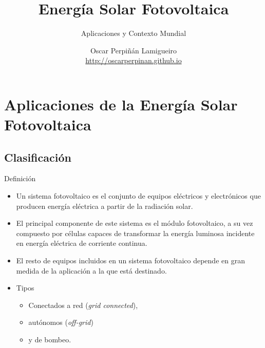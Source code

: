 \documentclass[xcolor={usenames,svgnames,dvipsnames}]{beamer}
\author{Oscar Perpiñán Lamigueiro \\ \url{http://oscarperpinan.github.io}}
\date{}
\title{Energía Solar Fotovoltaica}
\subtitle{Aplicaciones y Contexto Mundial}
\begin{document}
\maketitle

\section{Aplicaciones de la Energía Solar Fotovoltaica}
\label{sec:org6c56168}

\subsection{Clasificación}
\label{sec:org449f094}

\begin{frame}[label={sec:orgf003049}]{Definición}
\begin{itemize}
\item Un sistema fotovoltaico es el conjunto de equipos eléctricos y
electrónicos que producen energía eléctrica a partir de la radiación
solar.

\item El principal componente de este sistema es el módulo fotovoltaico, a
su vez compuesto por células capaces de transformar la energía
luminosa incidente en energía eléctrica de corriente continua.

\item El resto de equipos incluidos en un sistema fotovoltaico depende en
gran medida de la aplicación a la que está destinado.

\item Tipos
\begin{itemize}
\item Conectados a red (\emph{grid connected}),

\item autónomos (\emph{off-grid})

\item y de bombeo.
\end{itemize}
\end{itemize}
\end{frame}
\end{document}
